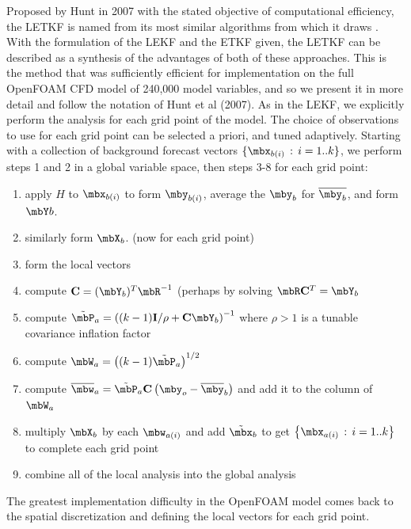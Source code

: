 Proposed by Hunt in 2007 with the stated objective of computational efficiency, the LETKF is named from its most similar algorithms from which it draws \cite{hunt2007efficient}.
With the formulation of the LEKF and the ETKF given, the LETKF can be  described as a synthesis of the advantages of both of these approaches.
This is the method that was sufficiently efficient for implementation on the full OpenFOAM CFD model of 240,000 model variables, and so we present it in more detail and follow the notation of Hunt et al (2007). 
As in the LEKF, we explicitly perform the analysis for each grid point of the model.
The choice of observations to use for each grid point can be selected a priori, and tuned adaptively.
Starting with a collection of background forecast vectors $\{ \mbx_{b(i)} \,:\,i=1..k \}$, we perform steps 1 and 2 in a global variable space, then steps 3-8 for each grid point:
\begin{enumerate}
\item apply $H$ to $\mbx_{b(i)}$ to form $\mby_{b(i)}$, average the $\mby_b$ for $\overline{\mby_b}$, and form $\mbY b$.
\item similarly form $\mbX_b$. (now for each grid point)
\item form the local vectors
\item compute $\mathbf{C}=(\mbY_b)^T\mbR^{-1}$ (perhaps by solving $\mbR \mathbf{C}^T = \mbY_b$
\item compute $\tilde{\mbP}_a = \left( (k-1)\mathbf{I} / \rho + \mathbf{C} \mbY _b \right ) ^{-1}$ where $\rho > 1$ is a tunable covariance inflation factor
\item compute $\mbW_a = \left ( (k-1) \tilde{\mbP} _a \right ) ^{1/2}$
\item compute $\overline{\mbw} _a  = \tilde{\mbP}_a \mathbf{C} \left ( \mby_o - \overline{\mby} _b \right )$ and add it to the column of $\mbW_a$
\item multiply $\mbX_b$ by each $\mbw_{a(i)}$ and add $\tilde{\mbx}_b$ to get $\left\{ \mbx_{a(i)}\,:\,i=1..k\right \}$ to complete each grid point
\item combine all of the local analysis into the global analysis
\end{enumerate}
The greatest implementation difficulty in the OpenFOAM model comes back to the spatial discretization and defining the local vectors for each grid point.

